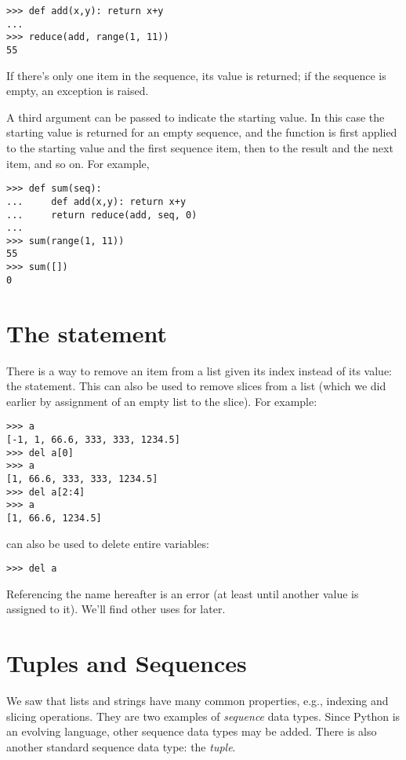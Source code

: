 \documentclass{manual}
\begin{document}
\begin{verbatim}
>>> def add(x,y): return x+y
...
>>> reduce(add, range(1, 11))
55
\end{verbatim}

If there's only one item in the sequence, its value is returned; if
the sequence is empty, an exception is raised.

A third argument can be passed to indicate the starting value.  In this
case the starting value is returned for an empty sequence, and the
function is first applied to the starting value and the first sequence
item, then to the result and the next item, and so on.  For example,

\begin{verbatim}
>>> def sum(seq):
...     def add(x,y): return x+y
...     return reduce(add, seq, 0)
... 
>>> sum(range(1, 11))
55
>>> sum([])
0
\end{verbatim}

\section{The  statement}
\label{del}

There is a way to remove an item from a list given its index instead
of its value: the  statement.  This can also be used to
remove slices from a list (which we did earlier by assignment of an
empty list to the slice).  For example:

\begin{verbatim}
>>> a
[-1, 1, 66.6, 333, 333, 1234.5]
>>> del a[0]
>>> a
[1, 66.6, 333, 333, 1234.5]
>>> del a[2:4]
>>> a
[1, 66.6, 1234.5]
\end{verbatim}

 can also be used to delete entire variables:

\begin{verbatim}
>>> del a
\end{verbatim}

Referencing the name  hereafter is an error (at least until
another value is assigned to it).  We'll find other uses for
 later.

\section{Tuples and Sequences}
\label{tuples}

We saw that lists and strings have many common properties, e.g.,
indexing and slicing operations.  They are two examples of
\emph{sequence} data types.  Since Python is an evolving language,
other sequence data types may be added.  There is also another
standard sequence data type: the \emph{tuple}.
\end{document}
